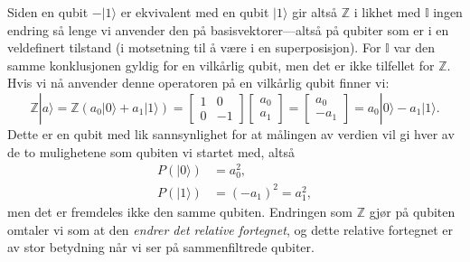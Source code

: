 Siden en qubit $-|1\rangle$ er ekvivalent med en qubit $|1\rangle$ gir altså $\mathbb{Z}$ i likhet med $\mathbb{I}$ ingen endring så lenge vi anvender den på basisvektorer---altså på qubiter som er i en veldefinert tilstand (i motsetning til å være i en superposisjon). For $\mathbb{I}$ var den samme konklusjonen gyldig for en vilkårlig qubit, men det er ikke tilfellet for $\mathbb{Z}$. Hvis vi nå anvender denne operatoren på en vilkårlig qubit finner vi:
\begin{displaymath}
	\mathbb{Z}|a\rangle = \mathbb{Z}(a_0|0\rangle + a_1|1\rangle)= \left[\begin{array}{rr}1 & 0 \\ 0 & -1 \end{array}\right]\left[\begin{array}{r} a_0 \\ a_1\end{array}\right] 
	= \left[\begin{array}{r} a_0 \\ -a_1\end{array}\right] = a_0|0\rangle - a_1|1\rangle.
\end{displaymath}
Dette er en qubit med lik sannsynlighet for at målingen av verdien vil gi hver av de to mulighetene som qubiten vi startet med, altså
\begin{align*}
	P(|0\rangle) &= a_0^2, \\
	P(|1\rangle) &= (-a_1)^2 = a_1^2,
\end{align*}
men det er fremdeles ikke den samme qubiten. Endringen som $\mathbb{Z}$ gjør på qubiten omtaler vi som at den \emph{endrer det relative fortegnet}, og dette relative fortegnet er av stor betydning når vi ser på sammenfiltrede qubiter.

